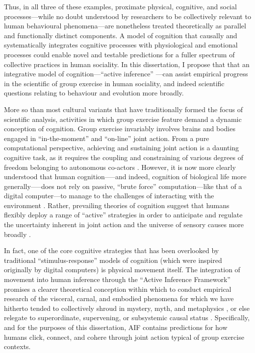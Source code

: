 \begin{CJK}{UTF8}{gbsn}
Thus, in all three of these examples, proximate physical, cognitive, and social processes---while no doubt understood by researchers to be collectively relevant to human behavioural phenomena---are nonetheless treated theoretically as parallel and functionally distinct components.  A model of cognition that causally and systematically integrates cognitive processes with physiological and emotional processes could enable novel and testable predictions for a fuller spectrum of collective practices in human sociality.  In this dissertation, I propose that that an integrative model of cognition---``active inference'' \citep{Friston2010}---can assist empirical progress in the scientific of group exercise in human sociality, and indeed scientific questions relating to behaviour and evolution more broadly.

More so than most cultural variants that have traditionally formed the focus of scientific analysis, activities in which group exercise feature demand a dynamic conception of cognition.  Group exercise invariably involves brains and bodies engaged in ``in-the-moment'' and ``on-line'' joint action.  From a pure computational perspective, achieving and sustaining joint action is a daunting cognitive task, as it requires the coupling and constraining of various degrees of freedom belonging to autonomous co-actors \citep{Bernstein1967,Turvey1978}.  However, it is now more clearly understood that human cognition—--and indeed, cognition of biological life more generally—--does not rely on passive, ``brute force'' computation---like that of a digital computer---to manage to the challenges of interacting with the environment \citep{Yufik2013}.  Rather, prevailing theories of cognition suggest that humans flexibly deploy a range of ``active'' strategies in order to anticipate and regulate the uncertainty inherent in joint action and the universe of sensory causes more broadly \citep{Clark2015}.

In fact, one of the core cognitive strategies that has been overlooked by traditional ``stimulus-response'' models of cognition (which were inspired originally by digital computers) is physical movement itself.  The integration of movement into human inference through the ``Active Inference Framework'' \citep[hereafter AIF cf.][]{Friston2010} promises a clearer theoretical conception within which to conduct empirical research of the visceral, carnal, and embodied phenomena for which we have hitherto tended to collectively shroud in mystery, myth, and metaphysics \citep{Atran2010}, or else relegate to superordinate, supervening, or subsystemic causal status   \citep{Clark2015,Linson2018}.  Specifically, and for the purposes of this dissertation, AIF contains predictions for how humans click, connect, and cohere through joint action typical of group exercise contexts.


\end{CJK}
